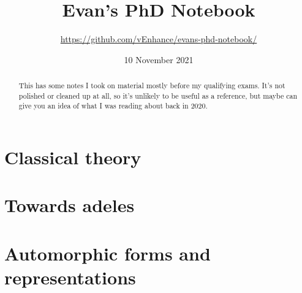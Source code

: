 \documentclass[11pt]{scrreprt}
\begin{document}
\title{Evan's PhD Notebook}
\subtitle{\url{https://github.com/vEnhance/evans-phd-notebook/}}
\date{10 November 2021}
\maketitle

\begin{abstract}
  This has some notes I took on material mostly before my qualifying exams.
  It's not polished or cleaned up at all,
  so it's unlikely to be useful as a reference,
  but maybe can give you an idea of what I was reading about back in 2020.
\end{abstract}

\tableofcontents

\part{Classical theory}




\part{Towards adeles}




\part{Automorphic forms and representations}



\printbibliography[title=References]
\end{document}

